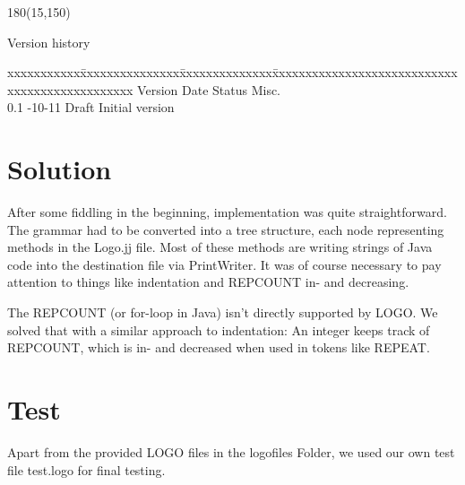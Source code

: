 \documentclass[
	a4paper,					%
	10pt,							%
	twoside,					%
	notitlepage,			%
	parskip=half,			%
]{scrreprt}					%
\begin{document}
%
%

\begin{textblock}{180}(15,150)
\color{black}
\begin{huge}
Version history
\end{huge}
\vspace{10mm}

\fontsize{10pt}{18pt}\selectfont
\begin{tabbing}
xxxxxxxxxxx\=xxxxxxxxxxxxxxx\=xxxxxxxxxxxxxx\=xxxxxxxxxxxxxxxxxxxxxxxxxxxxxxxxxxxxxxxxxxxxxxx \kill
Version	\> Date	\> Status		\> Misc.		\\
0.1	-10-11	\> Draft		\> Initial version	\\
\end{tabbing}

\end{textblock}

\cleardoubleemptypage
\setcounter{page}{1}
\cleardoublepage
{}
\let\cleardoublepage\clearpage


\color{black}





\chapter{Solution}
\label{chap:solution}
After some fiddling in the beginning, implementation was quite straightforward. The grammar had to be converted into a tree structure, each node representing methods in the Logo.jj file. Most of these methods are writing strings of Java code into the destination file via PrintWriter. It was of course necessary to pay attention to things like indentation and REPCOUNT in- and decreasing.

The REPCOUNT (or for-loop in Java) isn't directly supported by LOGO. We solved that with a similar approach to indentation: An integer keeps track of REPCOUNT, which is in- and decreased when used in tokens like REPEAT.

\begingroup
\renewcommand{\cleardoublepage}{}
\renewcommand{\clearpage}{}
\chapter{Test}
\label{chap:test}
Apart from the provided LOGO files in the logofiles Folder, we used our own test file test.logo for final testing.
\endgroup
\end{document}
